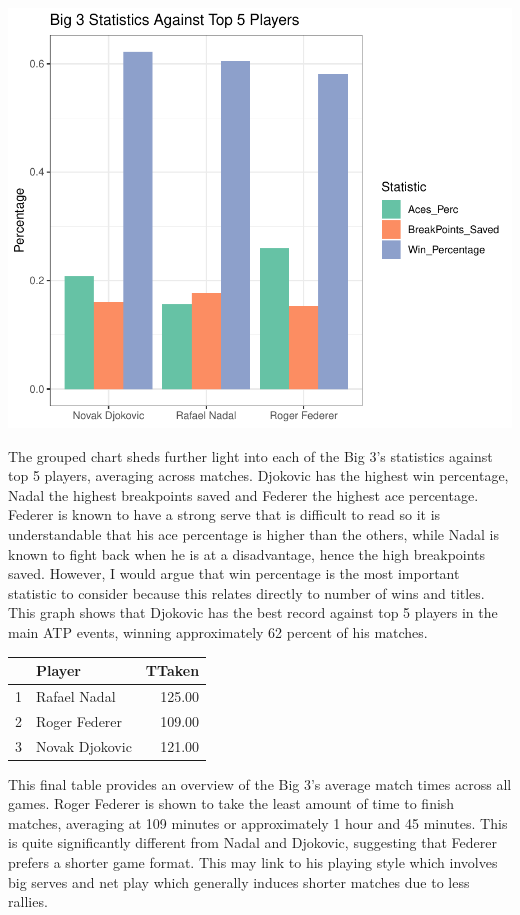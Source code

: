 \documentclass[11pt,preprint, authoryear]{elsarticle}
\let\origtable\table
\let\endorigtable\endtable
\renewenvironment{table}[1][2] {
    \expandafter\origtable\expandafter[H]
} {
    \endorigtable
}
\numberwithin{equation}{section}
\numberwithin{figure}{section}
\numberwithin{table}{section}
\begin{document}
\includegraphics{Write-up_files/figure-latex/grouped bar-1.pdf}

The grouped chart sheds further light into each of the Big 3's
statistics against top 5 players, averaging across matches. Djokovic has
the highest win percentage, Nadal the highest breakpoints saved and
Federer the highest ace percentage. Federer is known to have a strong
serve that is difficult to read so it is understandable that his ace
percentage is higher than the others, while Nadal is known to fight back
when he is at a disadvantage, hence the high breakpoints saved. However,
I would argue that win percentage is the most important statistic to
consider because this relates directly to number of wins and titles.
This graph shows that Djokovic has the best record against top 5 players
in the main ATP events, winning approximately 62 percent of his matches.

\begin{table}[ht]
\centering
\begin{tabular}{rlr}
  \hline
 & Player & TTaken \\ 
  \hline
1 & Rafael Nadal & 125.00 \\ 
  2 & Roger Federer & 109.00 \\ 
  3 & Novak Djokovic & 121.00 \\ 
   \hline
\end{tabular}
\caption{Average Time Taken} 
\end{table}

This final table provides an overview of the Big 3's average match times
across all games. Roger Federer is shown to take the least amount of
time to finish matches, averaging at 109 minutes or approximately 1 hour
and 45 minutes. This is quite significantly different from Nadal and
Djokovic, suggesting that Federer prefers a shorter game format. This
may link to his playing style which involves big serves and net play
which generally induces shorter matches due to less rallies.
\end{document}
